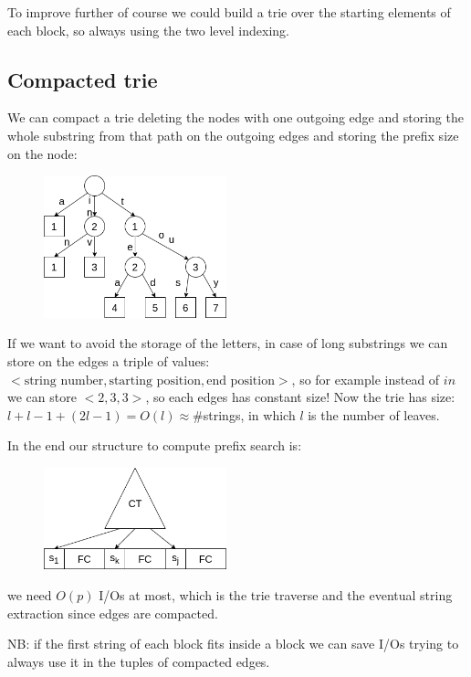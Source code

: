 To improve further of course we could build a trie over the starting elements of each block, so always using the two level indexing.

\subsection{Compacted trie}
We can compact a trie deleting the nodes with one outgoing edge and storing the whole substring from that path on the outgoing edges and storing the prefix size on the node:
\begin{figure}[H]
    \centering
    \includegraphics[width=200px]{images/8_Prefix_search/prefix_compacted_trie.png}
\end{figure}

If we want to avoid the storage of the letters, in case of long substrings we can store on the edges a triple of values: $<\text{string number}, \text{starting position}, \text{end position}>$, so for example instead of $in$ we can store $<2, 3, 3>$, so each edges has constant size!
Now the trie has size: $l + l - 1 + (2l -1) = O(l) \approx \#$strings, in which $l$ is the number of leaves.

In the end our structure to compute prefix search is:
\begin{figure}[H]
    \centering
    \includegraphics[width=200px]{images/8_Prefix_search/prefix_CT_and_FC.png}
\end{figure}
we need $O(p)$ I/Os at most, which is the trie traverse and the eventual string extraction since edges are compacted.

NB: if the first string of each block fits inside a block we can save I/Os trying to always use it in the tuples of compacted edges.

